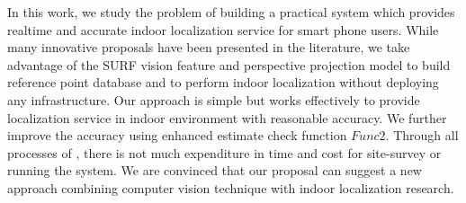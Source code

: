 In this work, we study the problem of building a practical system which provides realtime and accurate indoor localization service for smart phone users. While many innovative proposals have been presented in the literature, we take advantage of the SURF vision feature and perspective projection model to build reference point database and to perform indoor localization without deploying any infrastructure. Our approach is simple but works effectively to provide localization service in indoor environment with reasonable accuracy. We further improve the accuracy using enhanced estimate check function $Func2$. Through all processes of \oursystem, there is not much expenditure in time and cost for site-survey or running the system. We are convinced that our proposal can suggest a new approach combining computer vision technique with indoor localization research.
